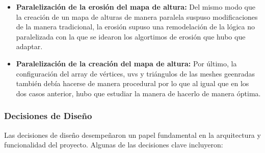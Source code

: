\begin{itemize}
    \item \textbf{Paralelización de la erosión del mapa de altura:} Del mismo modo que la creación de un mapa de alturas de manera paralela suspuso modificaciones de la manera tradicional, la erosión supuso una remodelación de la lógica no paralelizada con la que se idearon los algortimos de erosión que hubo que adaptar.
     
    \item \textbf{Paralelización de la creación del mapa de altura:} Por último, la configuración del array de vértices, uvs y triángulos de las meshes geenradas también debía hacerse de manera procedural por lo que al igual que en los dos casos anterior, hubo que estudiar la manera de hacerlo de manera óptima.

\end{itemize}

\subsubsection{Decisiones de Diseño}
Las decisiones de diseño desempeñaron un papel fundamental en la arquitectura y funcionalidad del proyecto. Algunas de las decisiones clave incluyeron:

